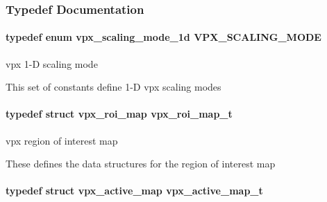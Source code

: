 \subsubsection{\-Typedef \-Documentation}
\hypertarget{group__vp8__encoder_ga100ca891ad96995e61780ae777bf8663}{
\paragraph[{\-V\-P\-X\-\_\-\-S\-C\-A\-L\-I\-N\-G\-\_\-\-M\-O\-D\-E}]{\setlength{\rightskip}{0pt plus 5cm}typedef enum {\bf vpx\-\_\-scaling\-\_\-mode\-\_\-1d}  {\bf \-V\-P\-X\-\_\-\-S\-C\-A\-L\-I\-N\-G\-\_\-\-M\-O\-D\-E}}}\label{group__vp8__encoder_ga100ca891ad96995e61780ae777bf8663}


vpx 1-\/\-D scaling mode 

\-This set of constants define 1-\/\-D vpx scaling modes \hypertarget{group__vp8__encoder_ga5be1a94d436a5e9296f5be06f57ccbd1}{
\paragraph[{vpx\-\_\-roi\-\_\-map\-\_\-t}]{\setlength{\rightskip}{0pt plus 5cm}typedef struct {\bf vpx\-\_\-roi\-\_\-map}  {\bf vpx\-\_\-roi\-\_\-map\-\_\-t}}}\label{group__vp8__encoder_ga5be1a94d436a5e9296f5be06f57ccbd1}


vpx region of interest map 

\-These defines the data structures for the region of interest map \hypertarget{group__vp8__encoder_ga7b48f7962f5061979f0f8ece6fb1cba8}{
\paragraph[{vpx\-\_\-active\-\_\-map\-\_\-t}]{\setlength{\rightskip}{0pt plus 5cm}typedef struct {\bf vpx\-\_\-active\-\_\-map}  {\bf vpx\-\_\-active\-\_\-map\-\_\-t}}}\label{group__vp8__encoder_ga7b48f7962f5061979f0f8ece6fb1cba8}


